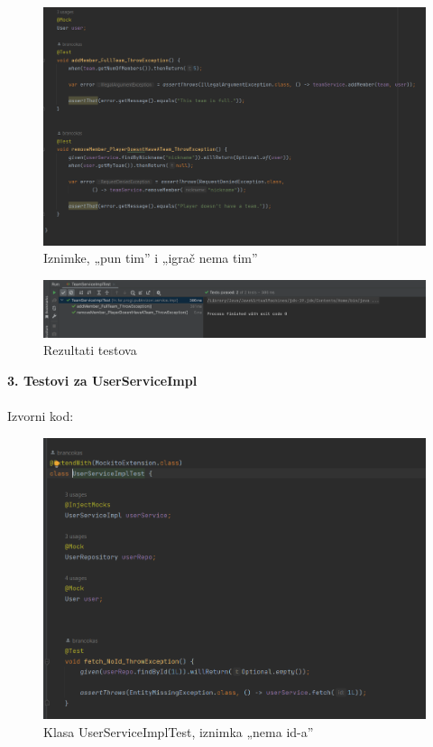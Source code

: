 				\begin{figure}[H]
					\includegraphics[width=\textwidth]{slike/TeamServiceImplTest2.PNG} 
					\caption{Iznimke, „pun tim” i „igrač nema tim”}
					\label{fig:TeamServiceImplTest2}
				\end{figure}
			
				\begin{figure}[H]
					\includegraphics[width=\textwidth]{slike/TeamServiceImplTestRez.PNG} 
					\caption{Rezultati testova}
					\label{fig:TeamServiceImplTestRez}
				\end{figure}
			
			\eject
			
			\textbf{3. Testovi za UserServiceImpl} \\ \\
			Izvorni kod:
				
				\begin{figure}[H]
					\includegraphics[width=\textwidth]{slike/UserServiceImplTest1.PNG} 
					\caption{Klasa UserServiceImplTest, iznimka „nema id-a”}
					\label{fig:UserServiceImplTest1}
				\end{figure}
				
